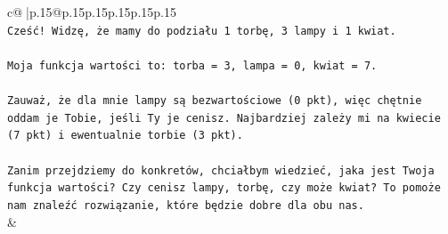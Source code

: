 \documentclass{article}
\begin{document}
{\begin{supertabular}{c@{$\;$}|p{.15\linewidth}@{}p{.15\linewidth}p{.15\linewidth}p{.15\linewidth}p{.15\linewidth}p{.15\linewidth}}
{{{\\ 
\texttt{Cześć! Widzę, że mamy do podziału 1 torbę, 3 lampy i 1 kwiat.} \\
\\ 
\texttt{Moja funkcja wartości to: torba = 3, lampa = 0, kwiat = 7.} \\
\\ 
\texttt{Zauważ, że dla mnie lampy są bezwartościowe (0 pkt), więc chętnie oddam je Tobie, jeśli Ty je cenisz. Najbardziej zależy mi na kwiecie (7 pkt) i ewentualnie torbie (3 pkt).} \\
\\ 
\texttt{Zanim przejdziemy do konkretów, chciałbym wiedzieć, jaka jest Twoja funkcja wartości? Czy cenisz lampy, torbę, czy może kwiat? To pomoże nam znaleźć rozwiązanie, które będzie dobre dla obu nas.} \\
            }
        }
    }
    & \\ \\


\end{supertabular}}
\end{document}
